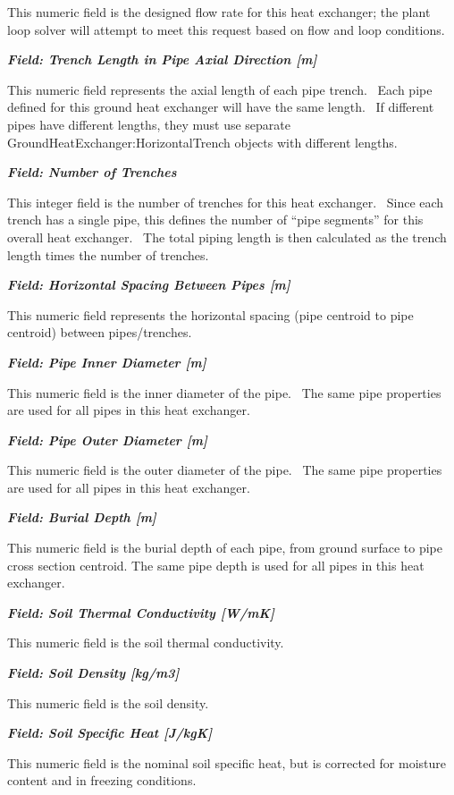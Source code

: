 This numeric field is the designed flow rate for this heat exchanger; the plant loop solver will attempt to meet this request based on flow and loop conditions.

\textbf{\emph{Field: Trench Length in Pipe Axial Direction {[}m{]}}}

This numeric field represents the axial length of each pipe trench.~ Each pipe defined for this ground heat exchanger will have the same length.~ If different pipes have different lengths, they must use separate GroundHeatExchanger:HorizontalTrench objects with different lengths.

\textbf{\emph{Field: Number of Trenches}}

This integer field is the number of trenches for this heat exchanger.~ Since each trench has a single pipe, this defines the number of ``pipe segments'' for this overall heat exchanger.~ The total piping length is then calculated as the trench length times the number of trenches.

\textbf{\emph{Field: Horizontal Spacing Between Pipes {[}m{]}}}

This numeric field represents the horizontal spacing (pipe centroid to pipe centroid) between pipes/trenches.

\textbf{\emph{Field: Pipe Inner Diameter {[}m{]}}}

This numeric field is the inner diameter of the pipe.~ The same pipe properties are used for all pipes in this heat exchanger.

\textbf{\emph{Field: Pipe Outer Diameter {[}m{]}}}

This numeric field is the outer diameter of the pipe.~ The same pipe properties are used for all pipes in this heat exchanger.

\textbf{\emph{Field: Burial Depth {[}m{]}}}

This numeric field is the burial depth of each pipe, from ground surface to pipe cross section centroid. The same pipe depth is used for all pipes in this heat exchanger.

\textbf{\emph{Field: Soil Thermal Conductivity {[}W/mK{]}}}

This numeric field is the soil thermal conductivity.

\textbf{\emph{Field: Soil Density {[}kg/m3{]}}}

This numeric field is the soil density.

\textbf{\emph{Field: Soil Specific Heat {[}J/kgK{]}}}

This numeric field is the nominal soil specific heat, but is corrected for moisture content and in freezing conditions.

